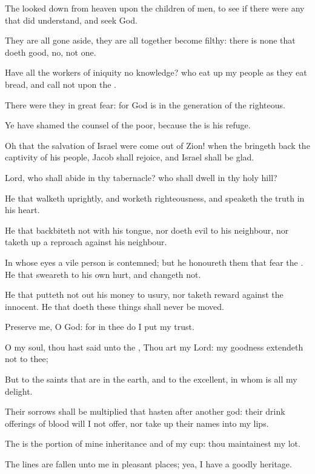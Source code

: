 \Verse The \LORD looked down from heaven upon the children of men, to see if there were any that did understand, and seek God.

\Verse They are all gone aside, they are all together become filthy: there is none that doeth good, no, not one.

\Verse Have all the workers of iniquity no knowledge? who eat up my people as they eat bread, and call not upon the \LORD.

\Verse There were they in great fear: for God is in the generation of the righteous.

\Verse Ye have shamed the counsel of the poor, because the \LORD is his refuge.

\Verse Oh that the salvation of Israel were come out of Zion! when the \LORD bringeth back the captivity of his people, Jacob shall rejoice, and Israel shall be glad.




\Chapter
\Verse Lord, who shall abide in thy tabernacle? who shall dwell in thy holy hill?

\Verse He that walketh uprightly, and worketh righteousness, and speaketh the truth in his heart.

\Verse He that backbiteth not with his tongue, nor doeth evil to his neighbour, nor taketh up a reproach against his neighbour.

\Verse In whose eyes a vile person is contemned; but he honoureth them that fear the \LORD. He that sweareth to his own hurt, and changeth not.

\Verse He that putteth not out his money to usury, nor taketh reward against the innocent. He that doeth these things shall never be moved.




\Chapter
\Verse Preserve me, O God: for in thee do I put my trust.

\Verse O my soul, thou hast said unto the \LORD, Thou art my Lord: my goodness extendeth not to thee;

\Verse But to the saints that are in the earth, and to the excellent, in whom is all my delight.

\Verse Their sorrows shall be multiplied that hasten after another god: their drink offerings of blood will I not offer, nor take up their names into my lips.

\Verse The \LORD is the portion of mine inheritance and of my cup: thou maintainest my lot.

\Verse The lines are fallen unto me in pleasant places; yea, I have a goodly heritage.

